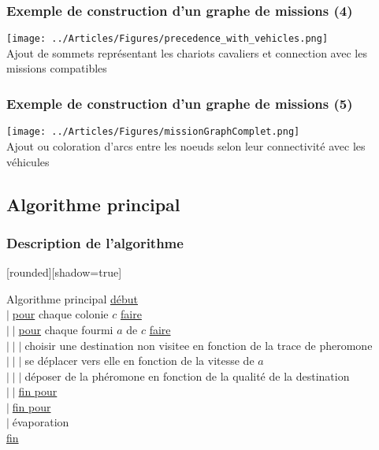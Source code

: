 \documentclass{beamer}
\begin{document}
\begin{frame}
	\frametitle{Exemple de construction d'un graphe de missions (4)}
 	\begin{center}
 		\texttt{[image: ../Articles/Figures/precedence\_with\_vehicles.png]}\\
		Ajout de sommets représentant les chariots cavaliers et connection avec les missions compatibles
	\end{center}
\end{frame}
\begin{frame}
	\frametitle{Exemple de construction d'un graphe de missions (5)}
 	\begin{center}
 		\texttt{[image: ../Articles/Figures/missionGraphComplet.png]}\\
		Ajout ou coloration d'arcs entre les noeuds selon leur connectivité avec les véhicules
	\end{center}
\end{frame}
\subsection*{Algorithme principal}

\begin{frame}
\frametitle{Description de l'algorithme}
	[rounded][shadow=true]
	\small
	\begin{block}{Algorithme principal}
	\underline{début}\\
	$\vert \;$\underline{pour} chaque colonie $c$ \underline{faire}\\
	$\vert \;\vert \;$\underline{pour} chaque fourmi $a$ de $c$ \underline{faire}\\
	$\vert \;\vert \;\vert \;$choisir une destination non visitee en fonction de la trace de pheromone\\
	$\vert \;\vert \;\vert \;$se déplacer vers elle en fonction de la vitesse de $a$\\
	$\vert \;\vert \;\vert \;$déposer de la phéromone en fonction de la qualité de la destination\\
	$\vert \;\vert \;$\underline{fin pour}\\
	$\vert \;$\underline{fin pour}\\
	$\vert \;$évaporation\\
	\underline{fin}\\
	\end{block}
	\normalsize
\end{frame}
\end{document}
